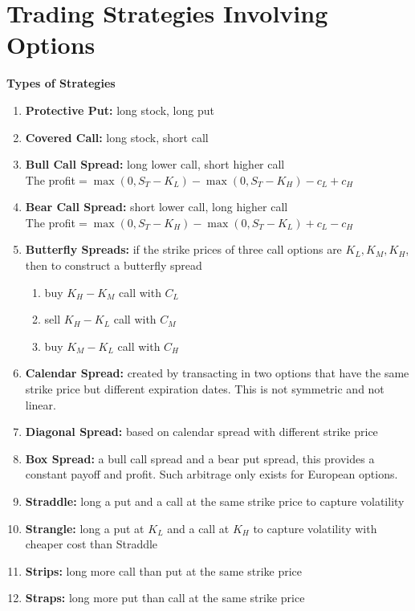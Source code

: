 \documentclass[11pt,fleqn]{book} %
\numberwithin{equation}{section} %
\numberwithin{figure}{section} %
\numberwithin{table}{section} %
\begin{document}
\chapter{Trading Strategies Involving Options}
\begin{definition}\textbf{Types of Strategies}
\begin{enumerate}
    \item \textbf{Protective Put:} long stock, long put
    \item \textbf{Covered Call:} long stock, short call
    \item \textbf{Bull Call Spread:} long lower call, short higher call\\
    The profit$=\max(0,S_T-K_L)-\max(0,S_T-K_H)-c_{L}+c_{H}$
    \item \textbf{Bear Call Spread:} short lower call, long higher call\\
    The profit$=\max(0,S_T-K_H)-\max(0,S_T-K_L)+c_{L}-c_{H}$
    \item \textbf{Butterfly Spreads:} if the strike prices of three call options are $K_L,K_M,K_H$, then to construct a butterfly spread
    \begin{enumerate}
        \item buy ${K_H-K_M}$ call with $C_L$
        \item sell ${K_H-K_L}$ call with $C_M$
        \item buy ${K_M-K_L}$ call with $C_H$
    \end{enumerate}
    \item \textbf{Calendar Spread:} created by transacting in two options that have the same strike price but different expiration dates. This is not symmetric and not linear.
    \item \textbf{Diagonal Spread:} based on calendar spread with different strike price
    \item \textbf{Box Spread:} a bull call spread and a bear put spread, this provides a constant payoff and profit. Such arbitrage only exists for European options.
    \item \textbf{Straddle:} long a put and a call at the same strike price to capture volatility
    \item \textbf{Strangle:} long a put at $K_L$ and a call at $K_H$ to capture volatility with cheaper cost than Straddle
    \item \textbf{Strips:} long more call than put at the same strike price
    \item \textbf{Straps:} long more put than call at the same strike price
\end{enumerate}
\end{definition}
\end{document}
